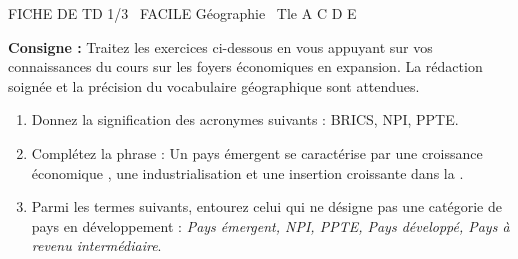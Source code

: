 \documentclass[11pt]{article}
\begin{document}
\begin{tcolorbox}[enhanced,colback=popink,colframe=popink,arc=10pt,boxrule=0pt,left=12pt,right=12pt,top=9pt,bottom=9pt]
{\color{white}\popxbold\small FICHE DE TD 1/3 \textbullet\ FACILE \hfill Géographie \textbullet\ Tle A C D E\par}
\end{tcolorbox}
\vspace{4pt}
\noindent \textbf{Consigne :} Traitez les exercices ci-dessous en vous appuyant sur vos connaissances du cours sur les foyers économiques en expansion. La rédaction soignée et la précision du vocabulaire géographique sont attendues.

\begin{exercice}
\begin{enumerate}
    \item Donnez la signification des acronymes suivants : BRICS, NPI, PPTE.
    \item Complétez la phrase : Un pays émergent se caractérise par une croissance économique \underline{\hspace{5cm}}, une industrialisation \underline{\hspace{5cm}} et une insertion croissante dans la \underline{\hspace{5cm}}.
    \item Parmi les termes suivants, entourez celui qui ne désigne pas une catégorie de pays en développement : \textit{Pays émergent, NPI, PPTE, Pays développé, Pays à revenu intermédiaire}.
\end{enumerate}
\end{exercice}
\end{document}
